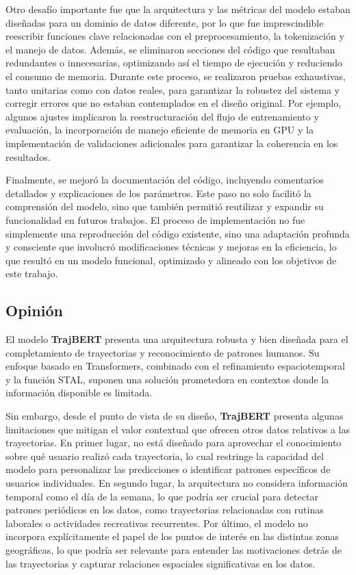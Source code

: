 Otro desafío importante fue que la arquitectura y las métricas del modelo estaban diseñadas para un dominio de datos diferente, por lo que fue imprescindible reescribir funciones clave relacionadas con el preprocesamiento, la tokenización y el manejo de datos. Además, se eliminaron secciones del código que resultaban redundantes o innecesarias, optimizando así el tiempo de ejecución y reduciendo el consumo de memoria. Durante este proceso, se realizaron pruebas exhaustivas, tanto unitarias como con datos reales, para garantizar la robustez del sistema y corregir errores que no estaban contemplados en el diseño original. Por ejemplo, algunos ajustes implicaron la reestructuración del flujo de entrenamiento y evaluación, la incorporación de manejo eficiente de memoria en GPU y la implementación de validaciones adicionales para garantizar la coherencia en los resultados.

Finalmente, se mejoró la documentación del código, incluyendo comentarios detallados y explicaciones de los parámetros. Este paso no solo facilitó la comprensión del modelo, sino que también permitió reutilizar y expandir su funcionalidad en futuros trabajos. El proceso de implementación no fue simplemente una reproducción del código existente, sino una adaptación profunda y consciente que involucró modificaciones técnicas y mejoras en la eficiencia, lo que resultó en un modelo funcional, optimizado y alineado con los objetivos de este trabajo.

\subsection{Opinión}

El modelo \textbf{TrajBERT} presenta una arquitectura robusta y bien diseñada para el completamiento de trayectorias y reconocimiento de patrones humanos. Su enfoque basado en Transformers, combinado con el refinamiento espaciotemporal y la función STAL, suponen una solución prometedora en contextos donde la información disponible es limitada.

Sin embargo, desde el punto de vista de su diseño, \textbf{TrajBERT} presenta algunas limitaciones que mitigan el valor contextual que ofrecen otros datos relativos a las trayectorias. En primer lugar, no está diseñado para aprovechar el conocimiento sobre qué usuario realizó cada trayectoria, lo cual restringe la capacidad del modelo para personalizar las predicciones o identificar patrones específicos de usuarios individuales. En segundo lugar, la arquitectura no considera información temporal como el día de la semana, lo que podría ser crucial para detectar patrones periódicos en los datos, como trayectorias relacionadas con rutinas laborales o actividades recreativas recurrentes. Por último, el modelo no incorpora explícitamente el papel de los puntos de interés en las distintas zonas geográficas, lo que podría ser relevante para entender las motivaciones detrás de las trayectorias y capturar relaciones espaciales significativas en los datos.

